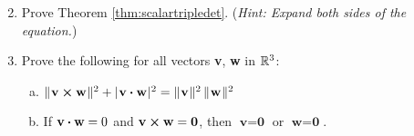 \begin{enumerate}[\bfseries 1.]
\begin{multicols}{2}
 \end{multicols}
 \item Prove Theorem \ref{thm:scalartripledet}. (\emph{Hint: Expand both sides of the equation.})
 \item Prove the following for all vectors \textbf{v}, \textbf{w} in $\mathbb{R}^{3}$:
  \begin{enumerate}[(a)]
   \item $\lVert\mspace{1mu}\textbf{v} \bm{\times} \textbf{w}\mspace{1mu}\rVert^2 + \lvert\mspace{1mu}\textbf{v} \bm{\cdot} \textbf{w}\mspace{1mu}\rvert^2 =
    \lVert\mspace{1mu}\textbf{v}\mspace{1mu}\rVert^2 \, \lVert\mspace{1mu}\textbf{w}\mspace{1mu}\rVert^2$
   \item If $\textbf{v} \bm{\cdot} \textbf{w} = 0$ and $\textbf{v} \bm{\times} \textbf{w} = \textbf{0}$, then
    $\textbf{v} = \textbf{0}$ or $\textbf{w} = \textbf{0}$.
  \end{enumerate}


\end{enumerate}
